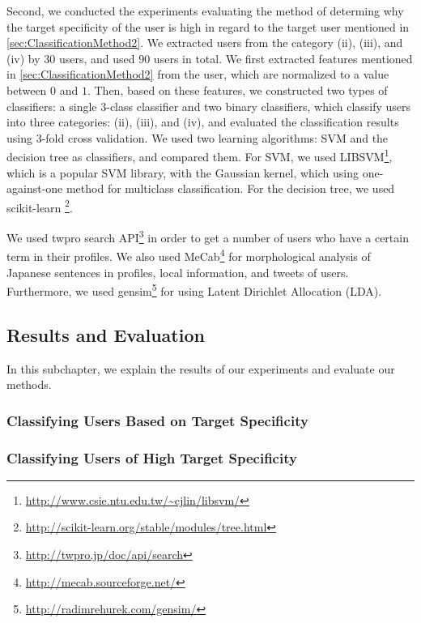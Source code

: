 Second, we conducted the experiments evaluating the method of determing
why the target specificity of the user is high in regard to the target
user mentioned in \ref{sec:ClassificationMethod2}.  We extracted users
from the category (ii), (iii), and (iv) by 30 users, and used 90 users
in total.  We first extracted features mentioned in
\ref{sec:ClassificationMethod2} from the user, which are normalized to a
value between $0$ and $1$.  Then, based on these features, we
constructed two types of classifiers: a single 3-class classifier and
two binary classifiers, which classify users into three categories:
(ii), (iii), and (iv), and evaluated the classification results using
3-fold cross validation.  We used two learning algorithms: SVM and the
decision tree as classifiers, and compared them.  For SVM, we used
LIBSVM\footnote{\url{http://www.csie.ntu.edu.tw/~cjlin/libsvm/}}, which
is a popular SVM library, with the Gaussian kernel, which using
one-against-one method for multiclass classification.  For the decision
tree, we used scikit-learn
\footnote{\url{http://scikit-learn.org/stable/modules/tree.html}}.

We used twpro search API\footnote{\url{http://twpro.jp/doc/api/search}}
in order to get a number of users who have a certain term in their
profiles.  We also used
MeCab\footnote{\url{http://mecab.sourceforge.net/}} for morphological
analysis of Japanese sentences in profiles, local information, and
tweets of users.  Furthermore, we used
gensim\footnote{\url{http://radimrehurek.com/gensim/}} for using Latent
Dirichlet Allocation (LDA).

\subsection{Results and Evaluation}
\label{subsec:Results}

In this subchapter, we explain the results of our experiments and
evaluate our methods.

\subsubsection{Classifying Users Based on Target Specificity}
\label{subsubsec:Result of Method1}

\subsubsection{Classifying Users of High Target Specificity}
\label{subsubsec:Result of Method2}


